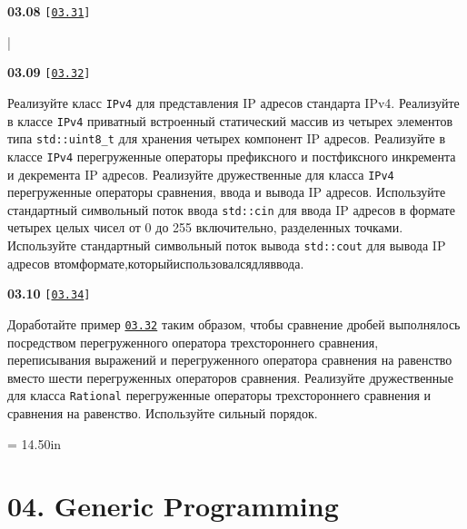 \documentclass[a4paper,12pt]{article}
\begin{document}
\bigskip

{\large \textbf{03.08} \texttt{[\href{https://github.com/i-s-m-mipt/Education/blob/master/projects/examples/source/03.31.cpp}{\texttt{03.31}}]}}

\bigskip

|

\bigskip

{\large \textbf{03.09} \texttt{[\href{https://github.com/i-s-m-mipt/Education/blob/master/projects/examples/source/03.32.cpp}{\texttt{03.32}}]}}

\bigskip

Реализуйте класс \lstinline{IPv4} для представления IP адресов стандарта IPv4. Реализуйте в классе \lstinline{IPv4} приватный встроенный статический массив из четырех элементов типа \lstinline{std::uint8_t} для хранения четырех компонент IP адресов. Реализуйте в классе \lstinline{IPv4} перегруженные операторы префиксного и постфиксного инкремента и декремента IP адресов. Реализуйте дружественные для класса \lstinline{IPv4} перегруженные операторы сравнения, ввода и вывода IP адресов. Используйте стандартный символьный поток ввода \lstinline{std::cin} для ввода IP адресов в формате четырех целых чисел от 0 до 255 включительно, разделенных точками. Используйте стандартный символьный поток вывода \lstinline{std::cout} для вывода IP адресов в\:том\:формате,\:который\:использовался\:для\:ввода.

\bigskip

{\large \textbf{03.10} \texttt{[\href{https://github.com/i-s-m-mipt/Education/blob/master/projects/examples/source/03.34.cpp}{\texttt{03.34}}]}}

\bigskip

Доработайте пример \href{https://github.com/i-s-m-mipt/Education/blob/master/projects/examples/source/03.32.cpp}{\texttt{03.32}} таким образом, чтобы сравнение дробей выполнялось посредством перегруженного оператора трехстороннего сравнения, переписывания выражений и перегруженного оператора сравнения на равенство вместо шести перегруженных операторов сравнения. Реализуйте дружественные для класса \lstinline{Rational} перегруженные операторы трехстороннего сравнения и сравнения на равенство. Используйте сильный порядок.



\newpage\thispagestyle{empty}\pdfpageheight = 14.50in\enlargethispage{100in}

\section{04. Generic Programming}
\end{document}
